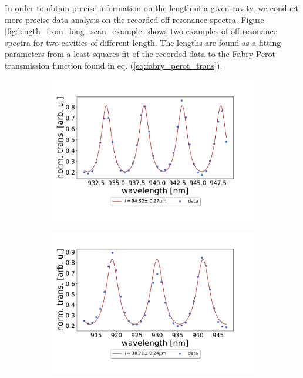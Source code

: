 In order to obtain precise information on the length of a given cavity, we conduct more precise data analysis on the recorded off-resonance spectra. Figure \ref{fig:length_from_long_scan_example} shows two examples of off-resonance spectra for two cavities of different length. The lengths are found as a fitting parameters from a least squares fit of the recorded data to the Fabry-Perot transmission function found in eq. (\ref{eq:fabry_perot_trans}). 

\begin{figure}[h!]
    \centering
    \begin{subfigure}[b]{0.49\textwidth}
        \includegraphics[width=\textwidth]{figures/length_from_fsr_example_100um.pdf}
        \caption{}
        \label{fig:100um_FSR}
    \end{subfigure}
    \begin{subfigure}[b]{0.49\textwidth}
        \includegraphics[width=\textwidth]{figures/length_from_fsr_example_40um.pdf}

\end{subfigure}
\end{figure}
